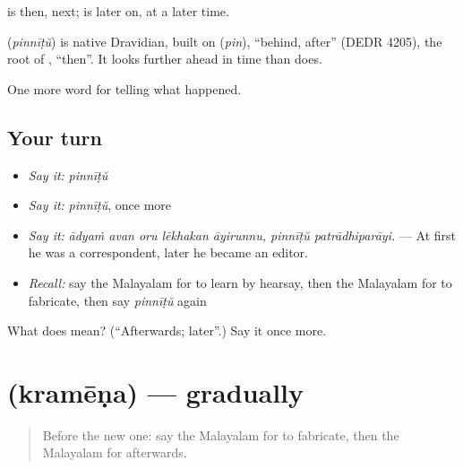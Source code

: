  is then, next;  is later on, at a later time.

\begin{cousinweb}
\textbf{} (\emph{pinnīṭŭ}) is native Dravidian, built on  (\emph{pin}), \textquotedblleft{}behind, after\textquotedblright{} (DEDR 4205), the root of , \textquotedblleft{}then\textquotedblright{}. It looks further ahead in time than  does.
\end{cousinweb}

\begin{grammarlens}[title={What you've built}]
One more word for telling what happened.
\end{grammarlens}

\subsection*{Your turn}
\begin{itemize}
\raggedright
  \item \emph{Say it:} \emph{pinnīṭŭ}
  \item \emph{Say it:} \emph{pinnīṭŭ}, once more
  \item \emph{Say it:} \emph{ādyaṁ avan oru lēkhakan āyirunnu, pinnīṭŭ patrādhiparāyi.} — At first he was a correspondent, later he became an editor.
  \item \emph{Recall:} say the Malayalam for to learn by hearsay, then the Malayalam for to fabricate, then say \emph{pinnīṭŭ} again
\end{itemize}

\begin{tcolorbox}[breakable,colback=teal!4,colframe=teal!35!black,title={Before you move on}]
What does  mean? (\textquotedblleft{}Afterwards; later\textquotedblright{}.) Say it once more.
\end{tcolorbox}
\section[\texorpdfstring{\ml{ക്രമേണ} (kramēṇa)}{ക്രമേണ (kramēṇa)}]{ (kramēṇa) — gradually}

\label{lesson:ML-C357-kramena}



\begin{quote}
Before the new one: say the Malayalam for to fabricate, then the Malayalam for afterwards.
\end{quote}

